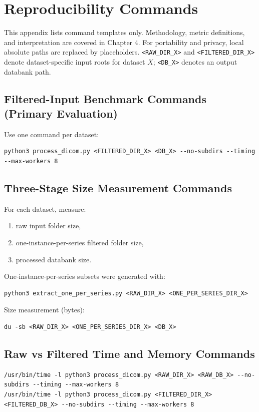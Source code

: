 \appendix
\chapter{Reproducibility Commands}
This appendix lists command templates only. Methodology, metric definitions, and interpretation are covered in Chapter 4.
For portability and privacy, local absolute paths are replaced by placeholders.
\texttt{<RAW\_DIR\_X>} and \texttt{<FILTERED\_DIR\_X>} denote dataset-specific input roots for dataset \(X\); \texttt{<DB\_X>} denotes an output databank path.

\section{Filtered-Input Benchmark Commands (Primary Evaluation)}
Use one command per dataset:
\begin{lstlisting}[breaklines=true,basicstyle=\ttfamily\small]
python3 process_dicom.py <FILTERED_DIR_X> <DB_X> --no-subdirs --timing --max-workers 8
\end{lstlisting}

\section{Three-Stage Size Measurement Commands}
For each dataset, measure:
\begin{enumerate}
\item raw input folder size,
\item one-instance-per-series filtered folder size,
\item processed databank size.
\end{enumerate}

One-instance-per-series subsets were generated with:
\begin{lstlisting}[breaklines=true,basicstyle=\ttfamily\small]
python3 extract_one_per_series.py <RAW_DIR_X> <ONE_PER_SERIES_DIR_X>
\end{lstlisting}

Size measurement (bytes):
\begin{lstlisting}[breaklines=true,basicstyle=\ttfamily\small]
du -sb <RAW_DIR_X> <ONE_PER_SERIES_DIR_X> <DB_X>
\end{lstlisting}

\section{Raw vs Filtered Time and Memory Commands}
\begin{lstlisting}[breaklines=true,basicstyle=\ttfamily\small]
/usr/bin/time -l python3 process_dicom.py <RAW_DIR_X> <RAW_DB_X> --no-subdirs --timing --max-workers 8
/usr/bin/time -l python3 process_dicom.py <FILTERED_DIR_X> <FILTERED_DB_X> --no-subdirs --timing --max-workers 8
\end{lstlisting}

